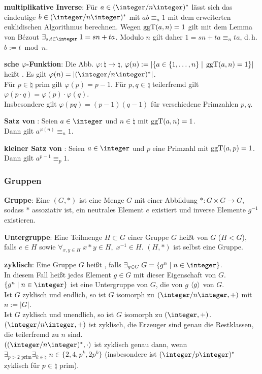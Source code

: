 \textbf{multiplikative Inverse}:
Für $a \in (\ZnZ)^\ast$ lässt sich
das eindeutige $b \in (\ZnZ)^\ast$ mit $ab \equiv_n 1$ mit dem
erweiterten euklidischen Algorithmus berechnen.
Wegen $\operatorname{ggT}(a, n) = 1$ gilt mit dem Lemma von Bézout $\exists_{s, t \in \integer}\; 1 = sn + ta$.
Modulo $n$ gilt daher $1 = sn + ta \equiv_n ta$, d.\,h. $b := t \bmod n$.

\textbf{sche $\varphi$-Funktion}:
Die Abb. $\varphi\colon \natural \rightarrow \natural$,
$\varphi(n) := \left|\{a \in \{1, \dotsc, n\} \;|\; \operatorname{ggT}(a, n) = 1\}\right|$
heißt .
Es gilt $\varphi(n) = |(\ZnZ)^\ast|$.\\
Für $p \in \natural$ prim gilt $\varphi(p) = p - 1$.
Für $p, q \in \natural$ teilerfremd gilt $\varphi(p \cdot q) = \varphi(p) \cdot \varphi(q)$.\\
Insbesondere gilt $\varphi(pq) = (p-1)(q-1)$ für verschiedene Primzahlen $p, q$.

\textbf{Satz von }:
Seien $a \in \integer$ und $n \in \natural$ mit $\operatorname{ggT}(a, n) = 1$.\\
Dann gilt $a^{\varphi(n)} \equiv_n 1$.

\textbf{kleiner Satz von }:
Seien $a \in \integer$ und $p$ eine Primzahl mit $\operatorname{ggT}(a, p) = 1$.\\
Dann gilt $a^{p-1} \equiv_p 1$.

\subsubsection{%
    Gruppen%
}

\textbf{Gruppe}:
Eine  $(G, \ast)$ ist eine Menge $G$ mit einer Abbildung
$\ast\colon G \times G \rightarrow G$, sodass
$\ast$ assoziativ ist,
ein neutrales Element $e$ existiert und
inverse Elemente $g^{-1}$ existieren.

\textbf{Untergruppe}:
Eine Teilmenge $H \subset G$ einer Gruppe $G$ heißt  von $G$
($H < G$),
falls $e \in H$ sowie $\forall_{x, y \in H}\; x \ast y \in H,\; x^{-1} \in H$.
$(H, \ast)$ ist selbst eine Gruppe.

\textbf{zyklisch}:
Eine Gruppe $G$ heißt , falls
$\exists_{g \in G}\; G = \{g^n \;|\; n \in \integer\}$.\\
In diesem Fall heißt jedes Element $g \in G$ mit dieser Eigenschaft  von $G$.\\
$\{g^n \;|\; n \in \integer\}$ ist eine Untergruppe von $G$, die von $g$
 $\langle g\rangle$ von $G$.\\
Ist $G$ zyklisch und endlich, so ist $G$ isomorph zu $(\ZnZ, +)$ mit $n := |G|$.\\
Ist $G$ zyklisch und unendlich, so ist $G$ isomorph zu $(\integer, +)$.\\
$(\ZnZ, +)$ ist zyklisch, die Erzeuger sind genau die Restklassen, die teilerfremd zu $n$ sind.\\
$((\ZnZ)^\ast, \cdot)$ ist zyklisch genau dann, wenn
$\exists_{p > 2 \text{ prim}} \exists_{k \in \natural}\; n \in \{2, 4, p^k, 2p^k\}$
(insbesondere ist $(\ZpZ)^\ast$ zyklisch für $p \in \natural$ prim).


